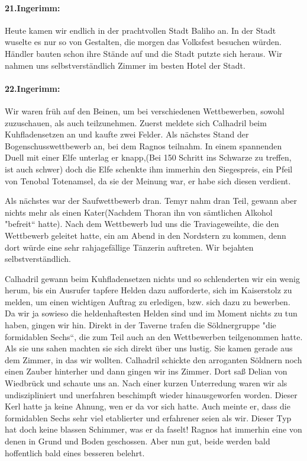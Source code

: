 \documentclass[11pt]{scrreprt}
\begin{document}
\paragraph{21.Ingerimm:}
Heute kamen wir endlich in der prachtvollen Stadt Baliho an. In der Stadt wuselte es nur so von Gestalten, die morgen das Volksfest besuchen würden. Händler bauten schon ihre Stände auf und die Stadt putzte sich heraus. Wir nahmen uns selbstverständlich Zimmer im besten Hotel der Stadt.

\paragraph{22.Ingerimm:}
Wir waren früh auf den Beinen, um bei verschiedenen Wettbewerben, sowohl zuzuschauen, als auch teilzunehmen. Zuerst meldete sich Calhadril beim Kuhfladensetzen an und kaufte zwei Felder. Als nächstes Stand der Bogenschusswettbewerb an, bei dem Ragnos teilnahm. In einem spannenden Duell mit einer Elfe unterlag er knapp,(Bei 150 Schritt ins Schwarze zu treffen, ist auch schwer) doch die Elfe schenkte ihm immerhin den Siegespreis, ein Pfeil von Tenobal Totenamsel, da sie der Meinung war, er habe sich diesen verdient.\par
Als nächstes war der Saufwettbewerb dran. Temyr nahm dran Teil, gewann aber nichts mehr als einen Kater(Nachdem Thoran ihn von sämtlichen Alkohol "befreit“ hatte). Nach dem Wettbewerb lud uns die Traviageweihte, die den Wettbewerb geleitet hatte, ein am Abend in den Nordstern zu kommen, denn dort würde eine sehr rahjagefällige Tänzerin auftreten. Wir bejahten selbstverständlich.\par
Calhadril gewann beim Kuhfladensetzen nichts und so schlenderten wir ein wenig herum, bis ein Ausrufer tapfere Helden dazu aufforderte, sich im Kaiserstolz zu melden, um einen wichtigen Auftrag zu erledigen, bzw. sich dazu zu bewerben. Da wir ja sowieso die heldenhaftesten Helden sind und im Moment nichts zu tun haben, gingen wir hin. Direkt in der Taverne trafen die Söldnergruppe "die formidablen Sechs“, die zum Teil auch an den Wettbewerben teilgenommen hatte. Als sie uns sahen machten sie sich direkt über uns lustig. Sie kamen gerade aus dem Zimmer, in das wir wollten. Calhadril schickte den arroganten Söldnern noch einen Zauber hinterher und dann gingen wir ins Zimmer. Dort saß Delian von Wiedbrück und schaute uns an. Nach einer kurzen Unterredung waren wir als undiszipliniert und unerfahren beschimpft wieder hinausgeworfen worden. Dieser Kerl hatte ja keine Ahnung, wen er da vor sich hatte. Auch meinte er, dass die formidablen Sechs sehr viel etablierter und erfahrener seien als wir. Dieser Typ hat doch keine blassen Schimmer, was er da faselt! Ragnos hat immerhin eine von denen in Grund und Boden geschossen. Aber nun gut, beide werden bald hoffentlich bald eines besseren belehrt. \par
\end{document}
